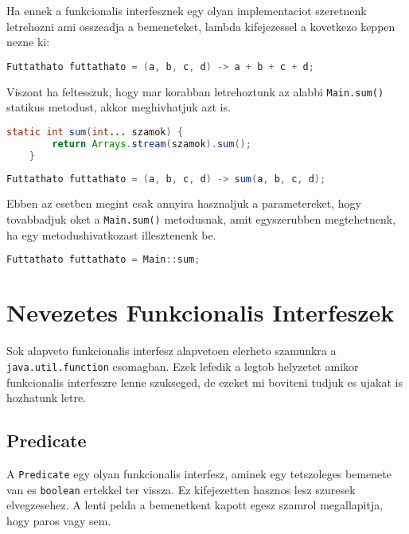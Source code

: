 \documentclass{article}
\let\l\lstinline
\begin{document}
Ha ennek a funkcionalis interfesznek egy olyan implementaciot szeretnenk letrehozni ami osszeadja a bemeneteket, lambda kifejezessel a kovetkezo keppen nezne ki:

\begin{lstlisting}[language=Java, caption=Lambda implementacio]
Futtathato futtathato = (a, b, c, d) -> a + b + c + d;
\end{lstlisting}

\newpage

Viszont ha feltesszuk, hogy mar korabban letrehoztunk az alabbi \l{Main.sum()} statikus metodust, akkor meghivhatjuk azt is.

\begin{lstlisting}[language=Java, caption=Sum() metodus]
	static int sum(int... szamok) {
		return Arrays.stream(szamok).sum();
	}
\end{lstlisting}

\begin{lstlisting}[language=Java, caption=Lambda implementacio metodushivassal]
Futtathato futtathato = (a, b, c, d) -> sum(a, b, c, d);
\end{lstlisting}

Ebben az esetben megint csak annyira hasznaljuk a parametereket, hogy tovabbadjuk oket a \l{Main.sum()} metodusnak, amit egyszerubben megtehetnenk, ha egy metodushivatkozast illesztenenk be.

\begin{lstlisting}[language=Java, caption=Implementacio metodus hivatkozassal]
Futtathato futtathato = Main::sum;
\end{lstlisting}

\newpage

\section{Nevezetes Funkcionalis Interfeszek}

Sok alapveto funkcionalis interfesz alapvetoen elerheto szamunkra a \l{java.util.function} csomagban. Ezek lefedik a legtob helyzetet amikor funkcionalis interfeszre lenne szukseged, de ezeket mi boviteni tudjuk es ujakat is hozhatunk letre.

\subsection{Predicate}

A \l{Predicate} egy olyan funkcionalis interfesz, aminek egy tetszoleges bemenete van es \l{boolean} ertekkel ter vissza. Ez kifejezetten hasznos lesz szuresek elvegzesehez. A lenti pelda a bemenetkent kapott egesz szamrol megallapitja, hogy paros vagy sem.
\end{document}
